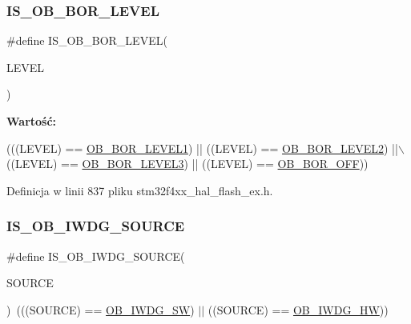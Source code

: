 \subsubsection{\texorpdfstring{I\+S\+\_\+\+O\+B\+\_\+\+B\+O\+R\+\_\+\+L\+E\+V\+EL}{IS\_OB\_BOR\_LEVEL}}
{\footnotesize\ttfamily \#define I\+S\+\_\+\+O\+B\+\_\+\+B\+O\+R\+\_\+\+L\+E\+V\+EL(\begin{DoxyParamCaption}\item[{}]{L\+E\+V\+EL }\end{DoxyParamCaption})}

{\bfseries Wartość\+:}
\begin{DoxyCode}
(((LEVEL) == \hyperlink{group___f_l_a_s_h_ex___b_o_r___reset___level_ga3a888b788e75f0bc1f9add85c9ccd9d6}{OB\_BOR\_LEVEL1}) || ((LEVEL) == \hyperlink{group___f_l_a_s_h_ex___b_o_r___reset___level_gad678e849fcf817f6ed2d837538e8ebc2}{OB\_BOR\_LEVEL2}) ||\(\backslash\)
                                ((LEVEL) == \hyperlink{group___f_l_a_s_h_ex___b_o_r___reset___level_ga3132b8202c0a345e9dd33d136714b046}{OB\_BOR\_LEVEL3}) || ((LEVEL) == 
      \hyperlink{group___f_l_a_s_h_ex___b_o_r___reset___level_gaabc231cb1d05a94fe860f67bb5a37b12}{OB\_BOR\_OFF}))
\end{DoxyCode}


Definicja w linii 837 pliku stm32f4xx\+\_\+hal\+\_\+flash\+\_\+ex.\+h.

\mbox{\label{group___f_l_a_s_h_ex___i_s___f_l_a_s_h___definitions_gaf2871652c08e76499d9449be6556f12c}} 
\subsubsection{\texorpdfstring{I\+S\+\_\+\+O\+B\+\_\+\+I\+W\+D\+G\+\_\+\+S\+O\+U\+R\+CE}{IS\_OB\_IWDG\_SOURCE}}
{\footnotesize\ttfamily \#define I\+S\+\_\+\+O\+B\+\_\+\+I\+W\+D\+G\+\_\+\+S\+O\+U\+R\+CE(\begin{DoxyParamCaption}\item[{}]{S\+O\+U\+R\+CE }\end{DoxyParamCaption})~(((S\+O\+U\+R\+CE) == \hyperlink{group___f_l_a_s_h_ex___option___bytes___i_watchdog_ga5a357e232c955444c3f2ccb9a937ffce}{O\+B\+\_\+\+I\+W\+D\+G\+\_\+\+SW}) $\vert$$\vert$ ((S\+O\+U\+R\+CE) == \hyperlink{group___f_l_a_s_h_ex___option___bytes___i_watchdog_gadfcbfa963d79c339ec8e2d5a7734e47a}{O\+B\+\_\+\+I\+W\+D\+G\+\_\+\+HW}))}



